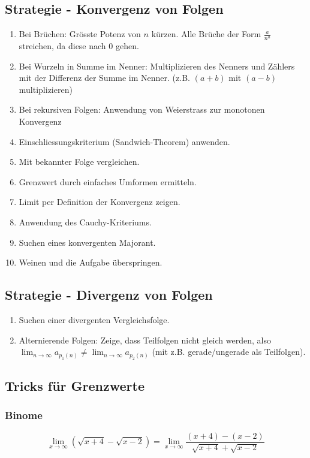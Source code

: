 \documentclass[a4paper,10pt]{article}
\def\limn{\lim_{n\to \infty}}
\begin{document}
\subsection{Strategie - Konvergenz von Folgen}
\begin{enumerate}
	\item Bei Brüchen: Grösste Potenz von $n$ kürzen. Alle Brüche der Form $\frac{a}{n^a}$ streichen, da diese nach 0 gehen.
	\item Bei Wurzeln in Summe im Nenner: Multiplizieren des Nenners und Zählers mit der Differenz der Summe im Nenner. (z.B. $(a+b)$ mit $(a-b)$ multiplizieren)
	\item Bei rekursiven Folgen: Anwendung von Weierstrass zur monotonen Konvergenz
	\item Einschliessungskriterium (Sandwich-Theorem) anwenden.
	\item Mit bekannter Folge vergleichen.
	\item Grenzwert durch einfaches Umformen ermitteln.
	\item Limit per Definition der Konvergenz zeigen.
	\item Anwendung des Cauchy-Kriteriums.
	\item Suchen eines konvergenten Majorant.
	\item Weinen und die Aufgabe überspringen.
\end{enumerate}

\subsection{Strategie - Divergenz von Folgen}
\begin{enumerate}
	\item Suchen einer divergenten Vergleichsfolge.
	\item Alternierende Folgen: Zeige, dass Teilfolgen nicht gleich werden, also $\limn a_{p_1(n)} \ne \limn a_{p_2(n)}$ (mit z.B. gerade/ungerade als Teilfolgen).
\end{enumerate}

\newpage
\subsection{Tricks für Grenzwerte}
\subsubsection{Binome}
$$\lim_{x\to\infty} (\sqrt{x + 4} - \sqrt{x - 2}) = \lim_{x\to\infty} \frac{(x+4)-(x-2)}{\sqrt{x+4}+\sqrt{x-2}}$$
\end{document}
